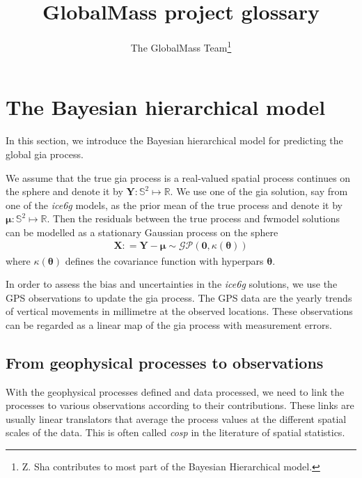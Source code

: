 \documentclass[a4paper,12pt]{article}
\begin{document}
 \title{GlobalMass project glossary}
\author{The GlobalMass Team\footnote{Z. Sha contributes to most part of the Bayesian Hierarchical model.}}
\maketitle

\onehalfspacing
{}


\section{The Bayesian hierarchical model}
In this section, we introduce the Bayesian hierarchical model for predicting the global \acrshort{gia} process. 

We assume that the true \acrshort{gia} process is a real-valued spatial process continues on the sphere and denote it by $\bm{Y}: \mathbb{S}^2 \mapsto \mathbb{R}$. We use one of the \acrshort{gia} solution, say from one of the \emph{ice6g} models, as the prior mean of the true process and denote it by $\bm{\mu}: \mathbb{S}^2 \mapsto \mathbb{R}$. Then the residuals between the true process and \gls{fwmodel} solutions can be modelled as a stationary Gaussian process on the sphere 
\begin{align}\label{eq:GIAresid}
 \bm{X}: = \bm{Y} - \bm{\mu} \sim \mathcal{GP}(\bm{0}, \kappa(\bm{\theta}))
\end{align}
where $\kappa(\bm{\theta})$ defines the covariance function with \gls{hyperpars} $\bm{\theta}$.

In order to assess the bias and uncertainties in the \emph{ice6g} solutions, we use the GPS observations to update the \acrshort{gia} process. The GPS  data are the yearly trends of vertical movements in millimetre at the observed locations. These observations can be regarded as a linear map of the \acrshort{gia} process with measurement errors.

\subsection{From geophysical processes to observations}
With the geophysical processes defined and data processed, we need to link the processes to various observations according to their contributions. These links are usually linear translators that average the process values at the different spatial scales of the data. This is often called \emph{\acrfull{cosp}} in the literature of spatial statistics. 
\end{document}
